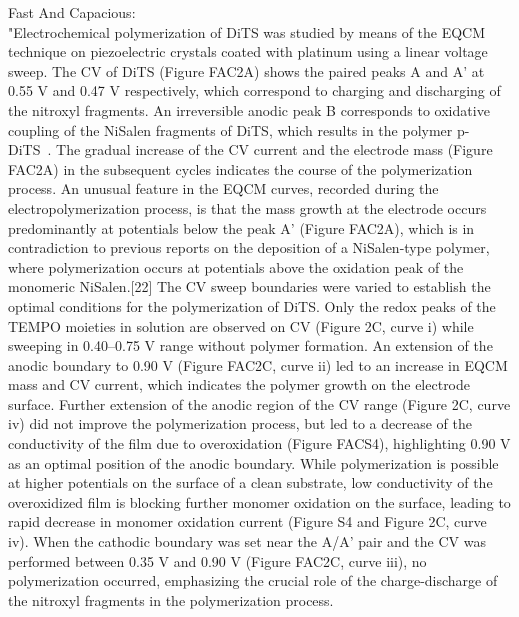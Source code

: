 Fast And Capacious:\\
"Electrochemical polymerization of DiTS was studied by means of the EQCM technique on piezoelectric crystals coated with platinum using a linear voltage sweep. The CV of DiTS (Figure FAC2A) shows the paired peaks A and A' at 0.55 V and 0.47 V respectively, which correspond to charging and discharging of the nitroxyl fragments. An irreversible anodic peak B corresponds to oxidative coupling of the NiSalen fragments
of DiTS, which results in the polymer p-DiTS~\cite{Vereshchagin_2019,Koshika_2009}. The gradual
increase of the CV current and the electrode mass (Figure FAC2A) in the subsequent cycles indicates the course of the polymerization process. An unusual feature in the EQCM curves, recorded during the electropolymerization process, is that the mass growth at the electrode occurs predominantly at potentials below the peak A' (Figure FAC2A), which is in contradiction to previous reports on the deposition of a NiSalen-type polymer, where polymerization occurs at potentials above the oxidation peak of the monomeric NiSalen.[22]
The CV sweep boundaries were varied to establish the optimal conditions for the polymerization of DiTS. Only the
redox peaks of the TEMPO moieties in solution are observed on CV (Figure 2C, curve i) while sweeping in 0.40–0.75 V range without polymer formation. An extension of the anodic
boundary to 0.90 V (Figure FAC2C, curve ii) led to an increase in EQCM mass and CV current, which indicates the polymer growth on the electrode surface. Further extension of the anodic region of the CV range (Figure 2C, curve iv) did not improve the polymerization process, but led to a decrease of
the conductivity of the film due to overoxidation (Figure FACS4), highlighting 0.90 V as an optimal position of the anodic boundary. While polymerization is possible at higher potentials on the surface of a clean substrate, low conductivity of the overoxidized film is blocking further monomer oxidation on the
surface, leading to rapid decrease in monomer oxidation current (Figure S4 and Figure 2C, curve iv). When the cathodic boundary was set near the A/A’ pair and the CV was performed
between 0.35 V and 0.90 V (Figure FAC2C, curve iii), no polymerization occurred, emphasizing the crucial role of the charge-discharge of the nitroxyl fragments in the polymerization process.\\

